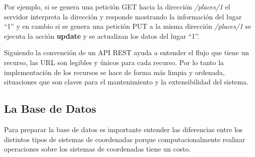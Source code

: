 


  Por ejemplo, si se genera una petición GET hacia la direcci\'on
  \mbox{\emph{/places/1}}  el servidor interpreta la dirección y responde
  mostrando la información del lugar “1” y en cambio si se genera
  una petición PUT a la misma direcci\'on \emph{/places/1} se ejecuta la acción \textbf{update} y se actualizan los datos del lugar ``1''.


  Siguiendo la convención de un API REST ayuda a entender el flujo que tiene un recurso,
  las URL son legibles y únicos para cada recurso. Por lo tanto la implementación   de los recursos se hace de forma más limpia y ordenada, situaciones que son   claves para el mantenimiento y la extensibilidad del sistema.




\subsection{La Base de Datos}
\label{sub:data_base}

        Para preparar la base de datos es importante entender las diferencias entre los distintos tipos de sistemas de coordenadas porque computacionalmente realizar operaciones sobre los sistemas de coordenadas tiene un costo.\\

